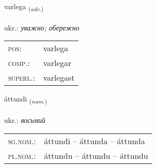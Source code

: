 \documentclass[frontgrid, backgrid]{flacards}\usepackage[]{graphicx}\usepackage[]{xcolor}
\begin{document}
\renewcommand{\flhead}{\vskip5pt \fboxsep=0pt {\small\bfseries\footnotesize Atviksorð | прислівник}}
\renewcommand{\fcfoot}{\vskip5pt \fboxsep=0pt \hspace{2pt}{\small\bfseries\footnotesize 3K}}

\renewcommand{\blhead}{\vskip5pt {\small\bfseries\footnotesize Atviksorð | прислівник }}
\renewcommand{\bcfoot}{\vskip5pt \hspace{2pt}{\small\bfseries\footnotesize 3K}}


{varlega \small{\textsubscript{(\textit{adv.})}} \\[1ex] %
\textphonetic{[varlɛɣa]} \\
ukr.: \emph{уважно; обережно} \\  [2ex]
\renewcommand*{\arraystretch}{0.8}
\begin{tabular}{ll}
\textsc{pos}: & varlega \\ 
\textsc{comp.}: & varlegar \\ 
\textsc{superl.}: & varlegast \\
\end{tabular}
}

\renewcommand{\flhead}{\vskip5pt \fboxsep=0pt {\small\bfseries\footnotesize Töluorð | чисельник}}
\renewcommand{\fcfoot}{\vskip5pt \fboxsep=0pt \hspace{2pt}{\small\bfseries\footnotesize 3K}}

\renewcommand{\blhead}{\vskip5pt {\small\bfseries\footnotesize Töluorð | чисельник }}
\renewcommand{\bcfoot}{\vskip5pt \hspace{2pt}{\small\bfseries\footnotesize 3K}}


{áttundi \small{\textsubscript{(\textit{num.})}} \\[1ex] %
\textphonetic{[auhtʏntɪ]} \\
ukr.: \emph{восьмий} \\  [2ex]
\renewcommand*{\arraystretch}{0.8}
\begin{tabular}{ll}
\textsc{sg.nom.}: & áttundi  --  áttunda -- áttunda \\ 
\textsc{pl.nom.}: & áttundu -- áttundu -- áttundu
\end{tabular}
}
\end{document}
